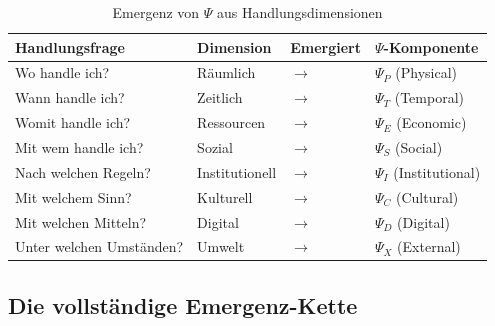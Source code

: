 \begin{table}[htbp]
\centering
\caption{Emergenz von $\Psi$ aus Handlungsdimensionen}
\label{tab:17-psi-emergence}
\renewcommand{\arraystretch}{1.3}
\begin{tabular}{@{}llll@{}}
\toprule
\textbf{Handlungsfrage} & \textbf{Dimension} & \textbf{Emergiert} & \textbf{$\Psi$-Komponente} \\
\midrule
Wo handle ich? & R\"{a}umlich & $\rightarrow$ & $\Psi_P$ (Physical) \\
Wann handle ich? & Zeitlich & $\rightarrow$ & $\Psi_T$ (Temporal) \\
Womit handle ich? & Ressourcen & $\rightarrow$ & $\Psi_E$ (Economic) \\
Mit wem handle ich? & Sozial & $\rightarrow$ & $\Psi_S$ (Social) \\
Nach welchen Regeln? & Institutionell & $\rightarrow$ & $\Psi_I$ (Institutional) \\
Mit welchem Sinn? & Kulturell & $\rightarrow$ & $\Psi_C$ (Cultural) \\
Mit welchen Mitteln? & Digital & $\rightarrow$ & $\Psi_D$ (Digital) \\
Unter welchen Umst\"{a}nden? & Umwelt & $\rightarrow$ & $\Psi_X$ (External) \\
\bottomrule
\end{tabular}
\end{table}

\subsection{Die vollst\"{a}ndige Emergenz-Kette}
\label{sec:17-chain}

